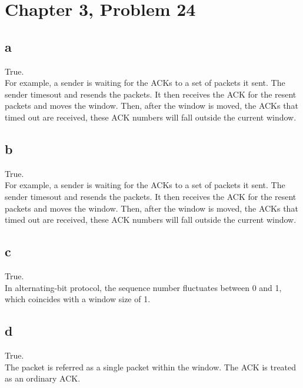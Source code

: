 \documentclass{article}
\begin{document}
\section*{Chapter 3, Problem 24}
\subsection*{a}
True.\\
\newline For example, a sender is waiting for the ACKs to a set of packets it sent.  The sender timesout and resends the packets.  It then receives the ACK for the resent packets and moves the window.  Then, after the window is moved, the ACKs that timed out are received, these ACK numbers will fall outside the current window.\\
\subsection*{b}
True.\\
\newline For example, a sender is waiting for the ACKs to a set of packets it sent.  The sender timesout and resends the packets.  It then receives the ACK for the resent packets and moves the window.  Then, after the window is moved, the ACKs that timed out are received, these ACK numbers will fall outside the current window.\\

\subsection*{c}
True.\\
\newline  In alternating-bit protocol, the sequence number fluctuates between 0 and 1, which coincides with a window size of 1.\\

\subsection*{d}
True.\\
\newline The packet is referred as a single packet within the window.  The ACK is treated as an ordinary ACK.\\
\end{document}
